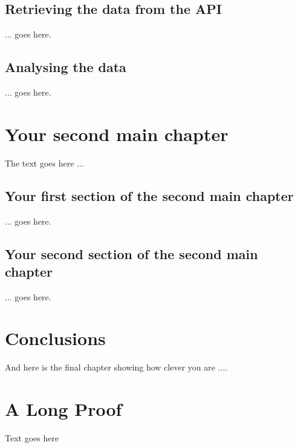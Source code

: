 \documentclass[12pt, a4paper,oneside]{book}
\numberwithin{equation}{section}
\begin{document}
\section{Retrieving the data from the API}\label{sec:2.1}

... goes here.

\section{Analysing the data}\label{sec:2.2}

... goes here.

\chapter{Your second main chapter}\label{ch:3}

The text goes here ... 

\section{Your first section of the second main chapter}\label{sec:3.1}

... goes here.

\section{Your second section of the second main chapter}\label{sec:3.2}

... goes here.

\chapter{Conclusions}\label{ch:concl}
And here is the final chapter showing how clever you are ....




\appendix
\chapter{A Long Proof}

Text goes here

\end{document}
